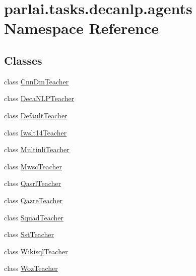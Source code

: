 \hypertarget{namespaceparlai_1_1tasks_1_1decanlp_1_1agents}{}\section{parlai.\+tasks.\+decanlp.\+agents Namespace Reference}
\label{namespaceparlai_1_1tasks_1_1decanlp_1_1agents}
\subsection*{Classes}
\begin{DoxyCompactItemize}
\item 
class \hyperlink{classparlai_1_1tasks_1_1decanlp_1_1agents_1_1CnnDmTeacher}{Cnn\+Dm\+Teacher}
\item 
class \hyperlink{classparlai_1_1tasks_1_1decanlp_1_1agents_1_1DecaNLPTeacher}{Deca\+N\+L\+P\+Teacher}
\item 
class \hyperlink{classparlai_1_1tasks_1_1decanlp_1_1agents_1_1DefaultTeacher}{Default\+Teacher}
\item 
class \hyperlink{classparlai_1_1tasks_1_1decanlp_1_1agents_1_1Iwslt14Teacher}{Iwslt14\+Teacher}
\item 
class \hyperlink{classparlai_1_1tasks_1_1decanlp_1_1agents_1_1MultinliTeacher}{Multinli\+Teacher}
\item 
class \hyperlink{classparlai_1_1tasks_1_1decanlp_1_1agents_1_1MwscTeacher}{Mwsc\+Teacher}
\item 
class \hyperlink{classparlai_1_1tasks_1_1decanlp_1_1agents_1_1QasrlTeacher}{Qasrl\+Teacher}
\item 
class \hyperlink{classparlai_1_1tasks_1_1decanlp_1_1agents_1_1QazreTeacher}{Qazre\+Teacher}
\item 
class \hyperlink{classparlai_1_1tasks_1_1decanlp_1_1agents_1_1SquadTeacher}{Squad\+Teacher}
\item 
class \hyperlink{classparlai_1_1tasks_1_1decanlp_1_1agents_1_1SstTeacher}{Sst\+Teacher}
\item 
class \hyperlink{classparlai_1_1tasks_1_1decanlp_1_1agents_1_1WikisqlTeacher}{Wikisql\+Teacher}
\item 
class \hyperlink{classparlai_1_1tasks_1_1decanlp_1_1agents_1_1WozTeacher}{Woz\+Teacher}
\end{DoxyCompactItemize}
